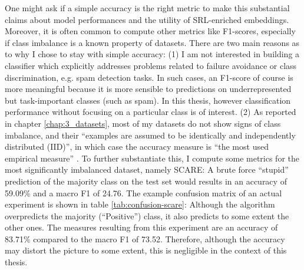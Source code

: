 One might ask if a simple accuracy is the right metric to make this substantial claims
about model performances and the utility of SRL-enriched embeddings. Moreover, it is
often common to compute other metrics like F1-scores, especially if class imbalance
is a known property of datasets. There are two main reasons as to why I chose to stay
with simple accuracy: (1) I am not interested in building a classifier which explicitly
addresses problems related to failure avoidance or class discrimination, e.g. spam
detection tasks. In such cases, an F1-score of course is more meaningful because it
is more sensible to predictions on underrepresented but task-important classes (such
as spam). In this thesis, however classification performance without focusing on a
particular class is of interest. (2) As reported in chapter \ref{chap:3_datasets}, most
of my datasets do not show signs of class imbalance, and their ``examples are assumed
to be identically and independently distributed (IID)'', in which case the accuracy measure is
``the most used empirical measure'' \citep{sokolova2006beyond}. To further substantiate
this, I compute some metrics for the most significantly imbalanced dataset, namely
SCARE: A brute force ``stupid'' prediction of the majority class on the test set would
results in an accuracy of 59.09\% and a macro F1 of 24.76. The example confusion
matrix of an actual experiment is shown in table \ref{tab:confusion-scare}: Although
the algorithm overpredicts the majority (``Positive'') class, it also predicts to some
extent the other ones. The measures resulting from this experiment are an accuracy of
83.71\% compared to the macro F1 of 73.52. Therefore, although the accuracy may distort
the picture to some extent, this is negligible in the context of this thesis.



